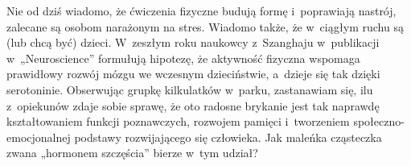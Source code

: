 \vfill

Nie od dziś wiadomo, że ćwiczenia fizyczne budują formę i~poprawiają nastrój, zalecane są osobom narażonym na stres. Wiadomo także, że w~ciągłym ruchu są (lub chcą być) dzieci.  W~zeszłym roku naukowcy z~Szanghaju w~publikacji w~„Neuroscience” formułują hipotezę, że aktywność fizyczna wspomaga prawidłowy rozwój mózgu we wczesnym dzieciństwie, a~dzieje się tak dzięki serotoninie. Obserwując grupkę kilkulatków w~parku, zastanawiam się, ilu z~opiekunów zdaje sobie sprawę, że oto radosne brykanie jest tak naprawdę kształtowaniem funkcji poznawczych, rozwojem pamięci i~tworzeniem społeczno-emocjonalnej podstawy rozwijającego się człowieka. Jak maleńka cząsteczka zwana „hormonem szczęścia” bierze w~tym udział?

